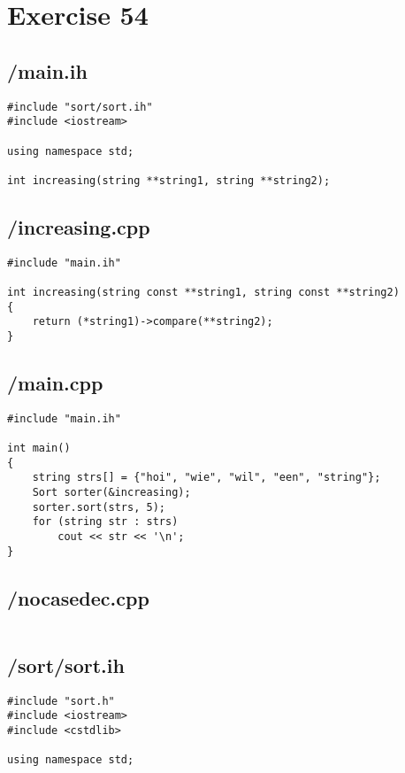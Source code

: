 \documentclass{article}
\begin{document}
\section*{Exercise 54}
\subsection*{/main.ih}
\begin{verbatim}
#include "sort/sort.ih"
#include <iostream>

using namespace std;

int increasing(string **string1, string **string2);

\end{verbatim}
\subsection*{/increasing.cpp}
\begin{verbatim}
#include "main.ih"

int increasing(string const **string1, string const **string2)
{
    return (*string1)->compare(**string2);
}

\end{verbatim}
\subsection*{/main.cpp}
\begin{verbatim}
#include "main.ih"

int main()
{
    string strs[] = {"hoi", "wie", "wil", "een", "string"};
    Sort sorter(&increasing);
    sorter.sort(strs, 5);
    for (string str : strs)
        cout << str << '\n';
}
\end{verbatim}
\subsection*{/nocasedec.cpp}
\begin{verbatim}

\end{verbatim}
\subsection*{/sort/sort.ih}
\begin{verbatim}
#include "sort.h"
#include <iostream>
#include <cstdlib>

using namespace std;

\end{verbatim}
\end{document}
